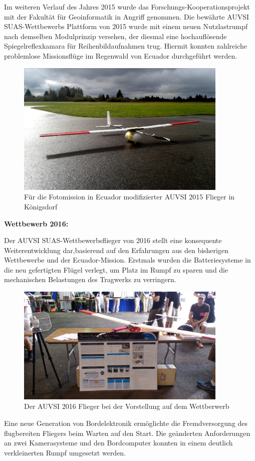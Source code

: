 Im weiteren Verlauf des Jahres 2015 wurde das Forschungs-Kooperationsprojekt mit der Fakultät für Geoinformatik in Angriff genommen. Die bewährte AUVSI SUAS-Wettbewerbs Plattform von 2015 wurde mit einem neuen Nutzlastrumpf nach demselben Modulprinzip versehen, der diesmal eine hochauflösende Spiegelreflexkamara für Reihenbildaufnahmen trug. Hiermit konnten zahlreiche problemlose Missionsflüge im Regenwald von Ecuador durchgeführt werden.

\begin{figure}[H]
\centering
\includegraphics[width=0.9\textwidth]{bilder/Fotos/Ecuadorflieger_Koenigsdorf.png} \caption{Für die Fotomission in Ecuador modifizierter AUVSI 2015 Flieger in Königsdorf} 
\label{Für die Fotomission in Ecuador modifizierter AUVSI 2015 Flieger in Königsdorf}
\end{figure}

\clearpage

\textbf{Wettbewerb 2016:}

Der AUVSI SUAS-Wettbewerbsflieger von 2016 stellt eine konsequente Weiterentwicklung dar,basierend auf den Erfahrungen aus den bisherigen Wettbewerbe und der Ecuador-Mission. Erstmals wurden die Batteriesysteme in die neu gefertigten Flügel verlegt, um Platz im Rumpf zu sparen und die mechanischen Belastungen des Tragwerks zu verringern.

\begin{figure}[H]
\centering
\includegraphics[width=0.9\textwidth]{bilder/Fotos/AUVSI_2016_Display.jpg} 
\caption{Der AUVSI 2016 Flieger bei der Vorstellung auf dem Wettberwerb} 
\label{Der AUVSI 2016 Flieger beim Display auf dem Wettberwerb}
\end{figure}

Eine neue Generation von Bordelektronik ermöglichte die Fremdversorgung des flugbereiten Fliegers beim Warten auf den Start. Die geänderten Anforderungen an zwei Kamerasysteme und den Bordcomputer konnten in einem deutlich verkleinerten Rumpf umgesetzt werden. 





